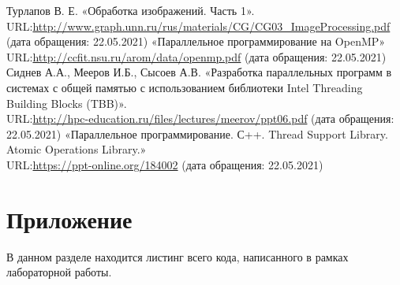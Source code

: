 \documentclass{report}
\begin{document}
\begin{thebibliography}{1}
 Турлапов В. Е. «Обработка изображений. Часть 1».
\\URL:\url {http://www.graph.unn.ru/rus/materials/CG/CG03_ImageProcessing.pdf} (дата обращения: 22.05.2021)
\bibitem{} «Параллельное программирование на OpenMP»
\\URL:\url {http://ccfit.nsu.ru/arom/data/openmp.pdf} (дата обращения: 22.05.2021)
 Сиднев А.А., Мееров И.Б., Сысоев А.В. «Разработка параллельных программ в системах с общей памятью с использованием библиотеки Intel Threading Building Blocks (TBB)».
\\URL:\url {http://hpc-education.ru/files/lectures/meerov/ppt06.pdf} (дата обращения: 22.05.2021)
\bibitem{} «Параллельное программирование. С++. Thread Support Library. Atomic Operations Library.»
\\URL:\url {https://ppt-online.org/184002} (дата обращения: 22.05.2021)
\end{thebibliography}
\newpage

\section*{Приложение}
В данном разделе находится листинг всего кода, написанного в рамках лабораторной работы.
\end{document}
